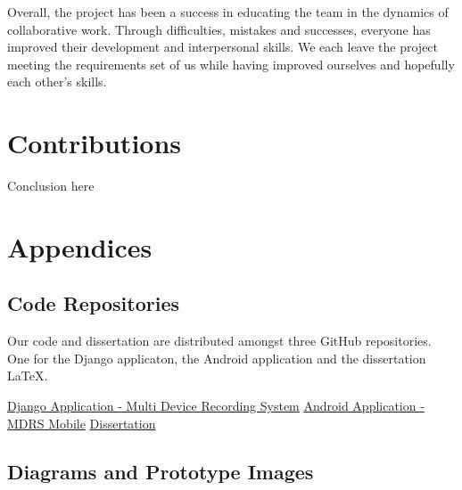 \documentclass{l3proj}
\begin{document}
Overall, the project has been a success in educating the team in the dynamics of collaborative work. Through difficulties, mistakes and successes, everyone has improved their development and interpersonal skills. We each leave the project meeting the requirements set of us while having improved ourselves and hopefully each other's skills.

\section{Contributions}

Conclusion here

\section{Appendices}
\subsection{Code Repositories}
Our code and dissertation are distributed amongst three GitHub repositories. One for the Django applicaton, the Android application and the dissertation LaTeX.

\href{https://github.com/Kaffse/multi-device-audio-project}{Django Application - Multi Device Recording System}
\href{https://github.com/allyjweir/mdrs-mobile}{Android Application - MDRS Mobile}
\href{https://github.com/allyjweir/dissertation-teamt-tp3}{Dissertation}

\subsection{Diagrams and Prototype Images}



\printglossaries
\end{document}
